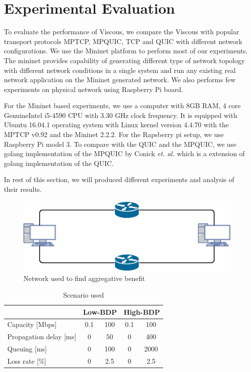 \section{Experimental Evaluation}

To evaluate the performance of Viscous, we compare the Viscous with popular transport protocols MPTCP, MPQUIC, TCP and QUIC with different network configurations. We use the Mininet platform to perform most of our experiments. The mininet provides capability of generating different type of network topology with different network conditions in a single system and run any existing real network application on the Mininet generated network. We also performs few experiments on physical network using Raspberry Pi board.

For the Mininet based experiments, we use a computer with 8GB RAM, 4 core GenuineIntel i5-4590 CPU with 3.30 GHz clock frequency. It is equipped with Ubuntu 16.04.1 operating system with Linux kernel version 4.4.70 with the MPTCP v0.92 and the Mininet 2.2.2. For the Rapsberry pi setup, we use Raspberry Pi model 3.
To compare with the QUIC and the MPQUIC, we use golang implementation of the MPQUIC by Conick {\it et. al.}\cite{mpquic-measure} which is a extension of golang implementation of the QUIC\cite{quic-go}.

In rest of this section, we will produced different experiments and analysis of their results.

\begin{figure}
	\centering
	\includegraphics[width=\linewidth]{img/aggregation.eps}
	\caption{\label{fig:aggregation_dia}Network used to find aggregative benefit}
\end{figure}

\begin{table}[h]
	\centering
	\begin{tabular}{l||c|c||c|c}
		& \multicolumn{2}{c||}{Low-BDP} & \multicolumn{2}{c}{High-BDP}\\
		\hline
		\hline
		Capacity [Mbps] & 0.1 & 100 & 0.1 & 100 \\
		\hline
		Propagation delay [ms] & 0 & 50 & 0 & 400 \\
		\hline
		Queuing [ms] & 0 & 100 & 0 & 2000 \\
		\hline
		Loss rate [\%] & 0 & 2.5 & 0 & 2.5 \\
	\end{tabular}
	\caption{\label{tbl:noloss_param}Scenario used}
\end{table}

